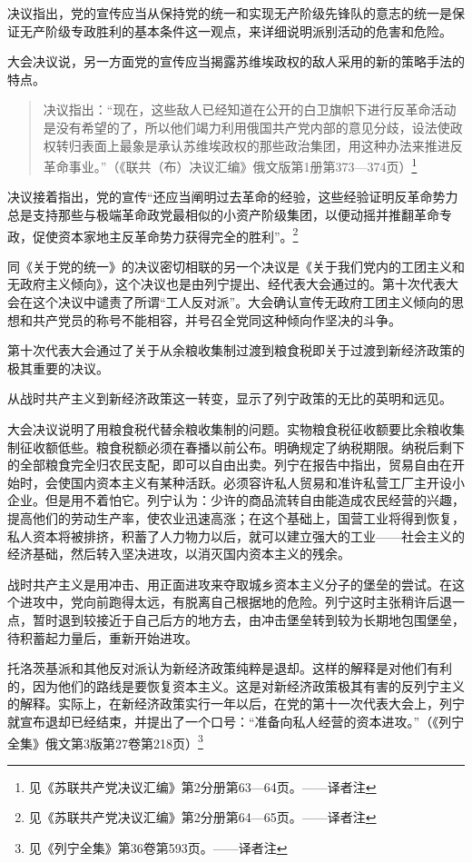 决议指出，党的宣传应当从保持党的统一和实现无产阶级先锋队的意志的统一是保证无产阶级专政胜利的基本条件这一观点，来详细说明派别活动的危害和危险。

大会决议说，另一方面党的宣传应当揭露苏维埃政权的敌人采用的新的策略手法的特点。

\begin{quotation}
决议指出：“现在，这些敌人已经知道在公开的白卫旗帜下进行反革命活动是没有希望的了，所以他们竭力利用俄国共产党内部的意见分歧，设法使政权转归表面上最象是承认苏维埃政权的那些政治集团，用这种办法来推进反革命事业。”（《联共（布）决议汇编》俄文版第1册第373—374页）\footnote{见《苏联共产党决议汇编》第2分册第63—64页。——译者注}
\end{quotation}

决议接着指出，党的宣传“还应当阐明过去革命的经验，这些经验证明反革命势力总是支持那些与极端革命政党最相似的小资产阶级集团，以便动摇并推翻革命专政，促使资本家地主反革命势力获得完全的胜利”。\footnote{见《苏联共产党决议汇编》第2分册第64—65页。——译者注}

同《关于党的统一》的决议密切相联的另一个决议是《关于我们党内的工团主义和无政府主义倾向》，这个决议也是由列宁提出、经代表大会通过的。第十次代表大会在这个决议中谴责了所谓“工人反对派”。大会确认宣传无政府工团主义倾向的思想和共产党员的称号不能相容，并号召全党同这种倾向作坚决的斗争。

第十次代表大会通过了关于从余粮收集制过渡到粮食税即关于过渡到新经济政策的极其重要的决议。

从战时共产主义到新经济政策这一转变，显示了列宁政策的无比的英明和远见。

大会决议说明了用粮食税代替余粮收集制的问题。实物粮食税征收额要比余粮收集制征收额低些。粮食税额必须在春播以前公布。明确规定了纳税期限。纳税后剩下的全部粮食完全归农民支配，即可以自由出卖。列宁在报告中指出，贸易自由在开始时，会使国内资本主义有某种活跃。必须容许私人贸易和准许私营工厂主开设小企业。但是用不着怕它。列宁认为：少许的商品流转自由能造成农民经营的兴趣，提高他们的劳动生产率，使农业迅速高涨；在这个基础上，国营工业将得到恢复，私人资本将被排挤，积蓄了人力物力以后，就可以建立强大的工业——社会主义的经济基础，然后转入坚决进攻，以消灭国内资本主义的残余。

战时共产主义是用冲击、用正面进攻来夺取城乡资本主义分子的堡垒的尝试。在这个进攻中，党向前跑得太远，有脱离自己根据地的危险。列宁这时主张稍许后退一点，暂时退到较接近于自己后方的地方去，由冲击堡垒转到较为长期地包围堡垒，待积蓄起力量后，重新开始进攻。

托洛茨基派和其他反对派认为新经济政策纯粹是退却。这样的解释是对他们有利的，因为他们的路线是要恢复资本主义。这是对新经济政策极其有害的反列宁主义的解释。实际上，在新经济政策实行一年以后，在党的第十一次代表大会上，列宁就宣布退却已经结束，并提出了一个口号：“准备向私人经营的资本进攻。”（《列宁全集》俄文第3版第27卷第218页）\footnote{见《列宁全集》第36卷第593页。——译者注}

